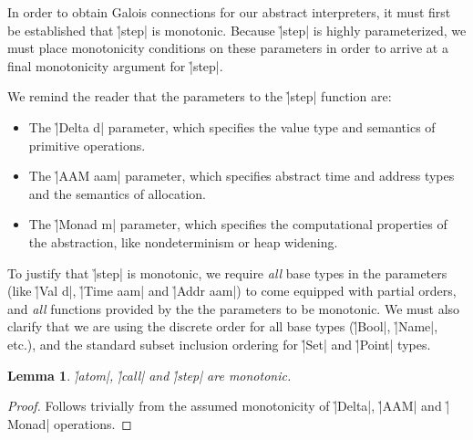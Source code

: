 In order to obtain Galois connections for our abstract interpreters, it must
first be established that \h|step| is monotonic.
%
Because \h|step| is highly parameterized, we must place monotonicity conditions
on these parameters in order to arrive at a final monotonicity argument for
\h|step|.


We remind the reader that the parameters to the \h|step| function are:
%
\begin{itemize}
\item The \h|Delta d| parameter, which specifies the value type and semantics of
      primitive operations.
\item The \h|AAM aam| parameter, which specifies abstract time and address types
      and the semantics of allocation.
\item The \h|Monad m| parameter, which specifies the computational properties
      of the abstraction, like nondeterminism or heap widening.
\end{itemize}
%
To justify that \h|step| is monotonic, we require \textit{all} base types in
the parameters (like \h|Val d|, \h|Time aam| and \h|Addr aam|) to come equipped
with partial orders, and \textit{all} functions provided by the the parameters
to be monotonic.
%
We must also clarify that we are using the discrete order for all base types
(\h|Bool|, \h|Name|, etc.), and the standard subset inclusion ordering for
\h|Set| and \h|Point| types.


\newtheorem{atom-call-step-monotonic}{Lemma}
\begin{atom-call-step-monotonic}
  \h|atom|, \h|call| and \h|step| are monotonic.
\end{atom-call-step-monotonic}
\begin{proof}
  Follows trivially from the assumed monotonicity of \h|Delta|, \h|AAM| and
  \h|Monad| operations.
\end{proof}
